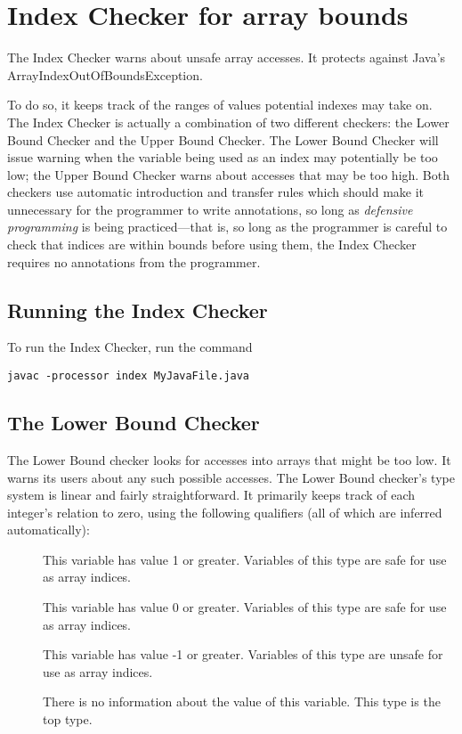\chapter{Index Checker for array bounds\label{index-checker}}

The Index Checker warns about unsafe array
accesses.
It protects against Java's
ArrayIndexOutOfBoundsException.

To do so, it keeps track of the ranges of values potential
indexes may take on.  The Index Checker is actually a combination of
two different checkers: the Lower
Bound Checker and the Upper Bound Checker.  The Lower Bound Checker
will issue warning when the variable being used as an index may
potentially be too low; the Upper Bound Checker warns about accesses
that may be too high. Both checkers use automatic introduction and
transfer rules which should make it unnecessary for the programmer to
write annotations, so long as \textit{defensive programming} is being
practiced---that is, so long as the programmer is careful to check
that indices are within bounds before using them, the Index Checker
requires no annotations from the programmer.

\section{Running the Index Checker\label{index-running}}

To run the Index Checker, run the command

\begin{Verbatim}
javac -processor index MyJavaFile.java
\end{Verbatim}


\section{The Lower Bound Checker\label{index-lowerbound}}

The Lower Bound checker looks for accesses into arrays that might be
too low.  It warns its users about any such possible accesses. The
Lower Bound checker's type system is linear and fairly
straightforward. It primarily keeps track of each integer's relation
to zero, using the following qualifiers (all of which are inferred
automatically):

\begin{description}
\item[]
  This variable has value 1 or greater.
  Variables of this type are safe for use as array indices.
\item[]
  This variable has value 0 or greater.
  Variables of this type are safe for use as array indices.
\item[]
  This variable has value -1 or greater.
  Variables of this type are unsafe for use as array indices.
\item[]
  There is no information about the value of this variable.
  This type is the top type.
\end{description}

